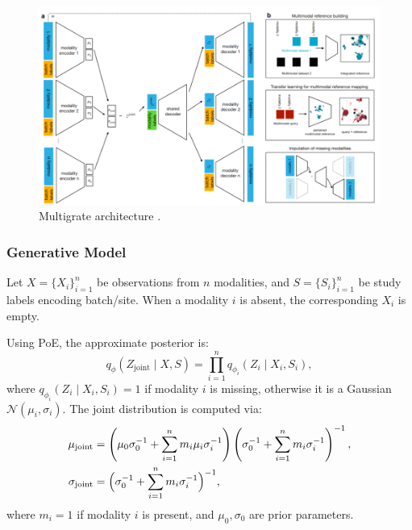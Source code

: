 \documentclass{article}
\begin{document}
\begin{figure}[H]
  \centering
  \includegraphics[width=0.8\linewidth]{multigrate_architecture}
  \caption{Multigrate architecture \cite{lotfollahi2022multigrate}.}
  \label{fig:multigrate_architecture}
\end{figure}

\subsubsection{Generative Model}
Let \(X = \{ X_i \}_{i=1}^{n}\) be observations from \(n\) modalities, 
and \(S = \{ S_i \}_{i=1}^{n}\) be study labels encoding batch/site. 
When a modality \(i\) is absent, the corresponding \(X_i\) is empty.

Using PoE, the approximate posterior is:
\begin{equation}
    q_{\phi}(Z_{\text{joint}} \mid X, S) = \prod_{i=1}^{n} q_{\phi_i}(Z_i \mid X_i, S_i),
\end{equation}
where \(q_{\phi_i}(Z_i \mid X_i, S_i)=1\) if modality \(i\) is missing, 
otherwise it is a Gaussian \(\mathcal{N}(\mu_i, \sigma_i)\). 
The joint distribution is computed via:
\begin{align}
    \mu_{\text{joint}} &= \left(\mu_0 \sigma_0^{-1} + \sum_{i=1}^{n} m_i \mu_i \sigma_i^{-1} \right)
                         \left( \sigma_0^{-1} + \sum_{i=1}^{n} m_i \sigma_i^{-1} \right)^{-1}, \\
    \sigma_{\text{joint}} &= \Bigl(\sigma_0^{-1} + \sum_{i=1}^{n} m_i \sigma_i^{-1}\Bigr)^{-1},
\end{align}
where \(m_i=1\) if modality \(i\) is present, and \(\mu_0, \sigma_0\) are prior parameters.
\end{document}
